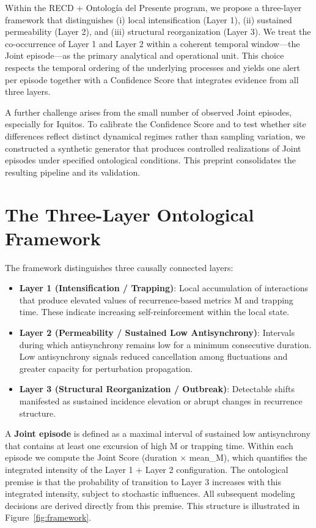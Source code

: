 \documentclass[11pt,a4paper]{article}
\begin{document}
Within the RECD + Ontología del Presente program, we propose a three-layer framework that distinguishes (i) local intensification (Layer 1), (ii) sustained permeability (Layer 2), and (iii) structural reorganization (Layer 3). We treat the co-occurrence of Layer 1 and Layer 2 within a coherent temporal window—the Joint episode—as the primary analytical and operational unit. This choice respects the temporal ordering of the underlying processes and yields one alert per episode together with a Confidence Score that integrates evidence from all three layers.

A further challenge arises from the small number of observed Joint episodes, especially for Iquitos. To calibrate the Confidence Score and to test whether site differences reflect distinct dynamical regimes rather than sampling variation, we constructed a synthetic generator that produces controlled realizations of Joint episodes under specified ontological conditions. This preprint consolidates the resulting pipeline and its validation.

\section{The Three-Layer Ontological Framework}

The framework distinguishes three causally connected layers:

\begin{itemize}
    \item \textbf{Layer 1 (Intensification / Trapping)}: Local accumulation of interactions that produce elevated values of recurrence-based metrics M and trapping time. These indicate increasing self-reinforcement within the local state.
    \item \textbf{Layer 2 (Permeability / Sustained Low Antisynchrony)}: Intervals during which antisynchrony remains low for a minimum consecutive duration. Low antisynchrony signals reduced cancellation among fluctuations and greater capacity for perturbation propagation.
    \item \textbf{Layer 3 (Structural Reorganization / Outbreak)}: Detectable shifts manifested as sustained incidence elevation or abrupt changes in recurrence structure.
\end{itemize}

A \textbf{Joint episode} is defined as a maximal interval of sustained low antisynchrony that contains at least one excursion of high M or trapping time. Within each episode we compute the Joint Score (duration $\times$ mean\_M), which quantifies the integrated intensity of the Layer 1 + Layer 2 configuration. The ontological premise is that the probability of transition to Layer 3 increases with this integrated intensity, subject to stochastic influences. All subsequent modeling decisions are derived directly from this premise. This structure is illustrated in Figure~\ref{fig:framework}.
\end{document}
